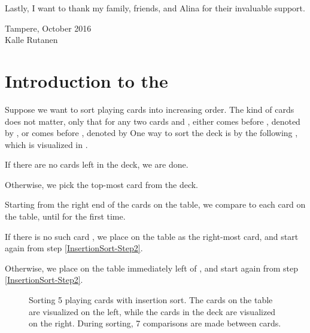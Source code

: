 \documentclass[b5paper, english, oneside]{memoir}
\begin{document}
Lastly, I want to thank my family, friends, and Alina for their invaluable support.

\bigskip
\begin{flushright}
Tampere, October 2016 \\
\vspace{1.5cm}
Kalle Rutanen
\end{flushright}

\newpage 
\tableofcontents
\newpage 

\mainmatter

\chapter{Introduction to the \manuscript{}}
\label{Introduction}

Suppose we want to sort playing cards into increasing order. The kind of cards does not matter, only that for any two cards  and , either  comes before , denoted by , or  comes before , denoted by  One way to sort the deck is by the following , which is visualized in .

\begin{enumbox}
\item\label{InsertionSort-Step2} If there are no cards left in the deck, we are done.
\item\label{InsertionSort-Step3} Otherwise, we pick the top-most card  from the deck.
\item\label{InsertionSort-Step4} Starting from the right end of the cards on the table, we compare  to each card  on the table, until  for the first time.
\item\label{InsertionSort-Step5} If there is no such card , we place  on the table as the right-most card, and start again from step \ref{InsertionSort-Step2}.
\item\label{InsertionSort-Step6} Otherwise, we place  on the table immediately left of , and start again from step \ref{InsertionSort-Step2}.
\end{enumbox}

\begin{figure}
\centering
{} \hfill
{}

 \hfill
{}

 \hfill
{}

\caption{Sorting 5 playing cards with insertion sort. The cards on the table are visualized on the left, while the cards in the deck are visualized on the right. During sorting, 7 comparisons are made between cards.}
\label{InsertionSortExample}
\end{figure}
\end{document}
